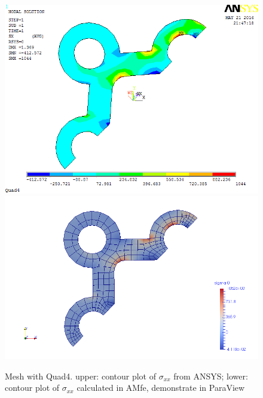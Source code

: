 \begin{figure}[htbp]
	\begin{center}
		\includegraphics[width=13cm,clip]{Quad4_Sxx.png} 		
		\includegraphics[width=13cm,clip]{Quad4_Sxx_P.png} 		
		\caption{Mesh with Quad4. upper: contour plot of $\sigma_{xx}$ from ANSYS; lower: contour plot of $\sigma_{xx}$ calculated in AMfe, demonstrate in ParaView} \label{fig: Quad4_Sxx}
	\end{center}
\end{figure}
\clearpage 

